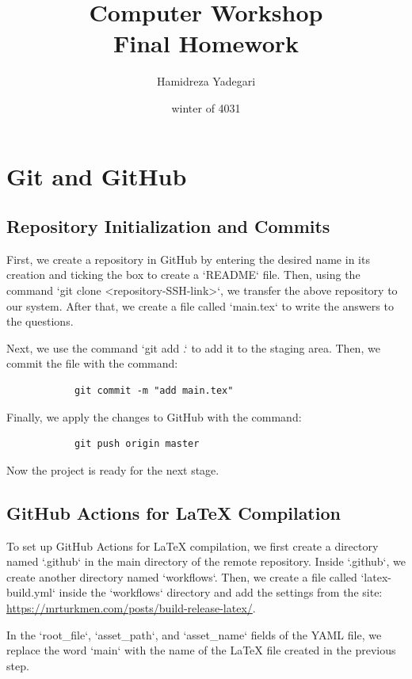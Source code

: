 \documentclass{article}
\title{Computer Workshop \\ Final Homework}
\author{Hamidreza Yadegari}
\date{winter of 4031}
\begin{document}
\maketitle 
\thispagestyle{empty}
\newpage

\tableofcontents
{}
\setcounter{page}{1}
\newpage

\section{Git and GitHub}
    \subsection{Repository Initialization and Commits}
        First, we create a repository in GitHub by entering the desired name in its creation and ticking the box to create a `README` file. Then, using the command `git clone <repository-SSH-link>`, we transfer the above repository to our system. After that, we create a file called `main.tex` to write the answers to the questions. 

        Next, we use the command `git add .` to add it to the staging area. Then, we commit the file with the command:
        \begin{verbatim}
            git commit -m "add main.tex"
        \end{verbatim}
            Finally, we apply the changes to GitHub with the command:
        \begin{verbatim}
            git push origin master
        \end{verbatim}
        Now the project is ready for the next stage.
    \\
    \subsection{GitHub Actions for LaTeX Compilation}
        To set up GitHub Actions for LaTeX compilation, we first create a directory named `.github` in the main directory of the remote repository. Inside `.github`, we create another directory named `workflows`. Then, we create a file called `latex-build.yml` inside the `workflows` directory and add the settings from the site:
        \url{https://mrturkmen.com/posts/build-release-latex/}.
        
        In the `root\_file`, `asset\_path`, and `asset\_name` fields of the YAML file, we replace the word `main` with the name of the LaTeX file created in the previous step. 
        
\end{document}
